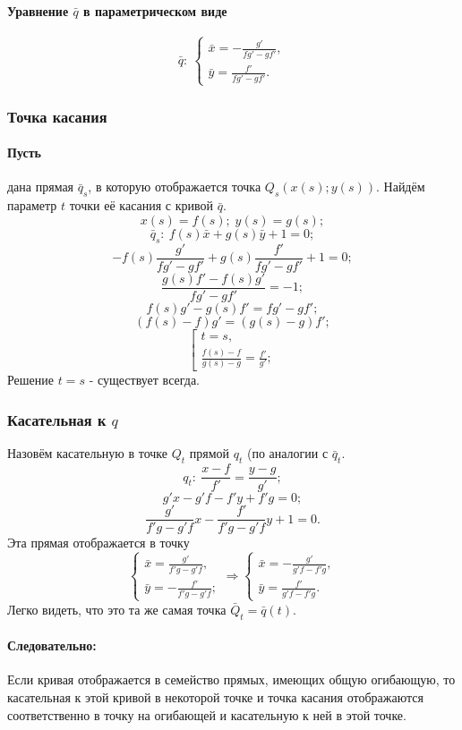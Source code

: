 \paragraph{Уравнение $\bar{q}$ в параметрическом виде}
$$\bar{q}:
\:
\left\{
\begin{gathered}
	\bar{x} =  -\frac{g'}{f g' - g f'},\\
	\bar{y} =  \frac{f'}{f g' - g f'}.
\end{gathered}
\right.
$$
\subsubsection{Точка касания}
\paragraph{Пусть} дана прямая $\bar{q}_s$, в которую отображается точка $Q_s (x(s); y(s))$. Найдём параметр $t$ точки её касания с кривой $\bar{q}$.
$$x(s) = f(s);\; y(s)= g(s);$$
$$\bar{q}_s: \: f(s)\bar{x} + g(s)\bar{y} + 1 = 0;$$
$$-f(s)\frac{g'}{f g' - g f'} + g(s)\frac{f'}{f g' - g f'} + 1 = 0;$$
$$\frac{g(s) f' - f(s) g'}{f g' - g f'} = -1;$$
$$f(s) g' - g(s) f' = f g' - g f';$$
$$(f(s) - f) g' = (g(s) - g) f';$$
$$\left[
\begin{gathered}
	t = s,\\
	\frac{f(s) - f}{g(s) - g} = \frac{f'}{g'};
\end{gathered}
\right.
$$
Решение $t = s$ - существует всегда.

\subsubsection{Касательная к $q$}
Назовём касательную в точке $Q_t$ прямой $q_t$ (по аналогии с $\bar{q}_t$.
$$q_t:\: \frac{x - f}{f'} = \frac{y - g}{g'};$$
$$g'x - g'f - f'y + f'g = 0;$$
$$\frac{g'}{f'g - g'f}x - \frac{f'}{f'g - g'f}y + 1 = 0.$$
Эта прямая отображается в точку 
$$
\left\{
\begin{gathered}
	\bar{x} = \frac{g'}{f'g - g'f}, \\
	\bar{y} = - \frac{f'}{f'g - g'f};
\end{gathered}
\right.
\Rightarrow
\left\{
\begin{gathered}
	\bar{x} = - \frac{g'}{g'f - f'g}, \\
	\bar{y} = \frac{f'}{g'f - f'g}.
\end{gathered}
\right.
$$
Легко видеть, что это та же самая точка $\bar{Q}_t = \bar{q}(t)$.

\paragraph{Следовательно:} Если кривая отображается в семейство прямых, имеющих общую огибающую, то касательная к этой кривой в некоторой точке и точка касания отображаются соответственно в точку на огибающей и касательную к ней в этой точке.